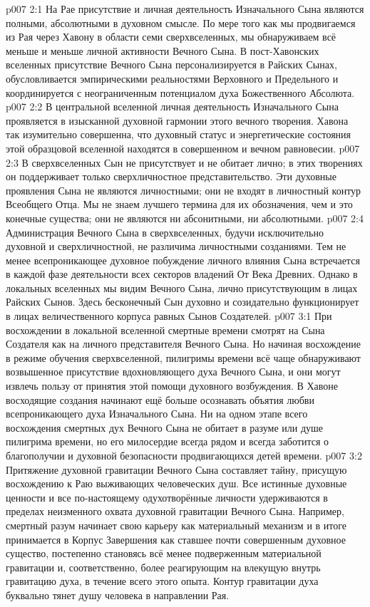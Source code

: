 \vs p007 2:1 На Рае присутствие и личная деятельность Изначального Сына являются полными, абсолютными в духовном смысле. По мере того как мы продвигаемся из Рая через Хавону в области семи сверхвселенных, мы обнаруживаем всё меньше и меньше личной активности Вечного Сына. В пост\hyp{}Хавонских вселенных присутствие Вечного Сына персонализируется в Райских Сынах, обусловливается эмпирическими реальностями Верховного и Предельного и координируется с неограниченным потенциалом духа Божественного Абсолюта.
\vs p007 2:2 В центральной вселенной личная деятельность Изначального Сына проявляется в изысканной духовной гармонии этого вечного творения. Хавона так изумительно совершенна, что духовный статус и энергетические состояния этой образцовой вселенной находятся в совершенном и вечном равновесии.
\vs p007 2:3 В сверхвселенных Сын не присутствует и не обитает лично; в этих творениях он поддерживает только сверхличностное представительство. Эти духовные проявления Сына не являются личностными; они не входят в личностный контур Всеобщего Отца. Мы не знаем лучшего термина для их обозначения, чем  и это конечные существа; они не являются ни абсонитными, ни абсолютными.
\vs p007 2:4 Администрация Вечного Сына в сверхвселенных, будучи исключительно духовной и сверхличностной, не различима личностными созданиями. Тем не менее всепроникающее духовное побуждение личного влияния Сына встречается в каждой фазе деятельности всех секторов владений От Века Древних. Однако в локальных вселенных мы видим Вечного Сына, лично присутствующим в лицах Райских Сынов. Здесь бесконечный Сын духовно и созидательно функционирует в лицах величественного корпуса равных Сынов Создателей.
\vs p007 3:1 При восхождении в локальной вселенной смертные времени смотрят на Сына Создателя как на личного представителя Вечного Сына. Но начиная восхождение в режиме обучения сверхвселенной, пилигримы времени всё чаще обнаруживают возвышенное присутствие вдохновляющего духа Вечного Сына, и они могут извлечь пользу от принятия этой помощи духовного возбуждения. В Хавоне восходящие создания начинают ещё больше осознавать объятия любви всепроникающего духа Изначального Сына. Ни на одном этапе всего восхождения смертных дух Вечного Сына не обитает в разуме или душе пилигрима времени, но его милосердие всегда рядом и всегда заботится о благополучии и духовной безопасности продвигающихся детей времени.
\vs p007 3:2 Притяжение духовной гравитации Вечного Сына составляет тайну, присущую восхождению к Раю выживающих человеческих душ. Все истинные духовные ценности и все по\hyp{}настоящему одухотворённые личности удерживаются в пределах неизменного охвата духовной гравитации Вечного Сына. Например, смертный разум начинает свою карьеру как материальный механизм и в итоге принимается в Корпус Завершения как ставшее почти совершенным духовное существо, постепенно становясь всё менее подверженным материальной гравитации и, соответственно, более реагирующим на влекущую внутрь гравитацию духа, в течение всего этого опыта. Контур гравитации духа буквально тянет душу человека в направлении Рая.

